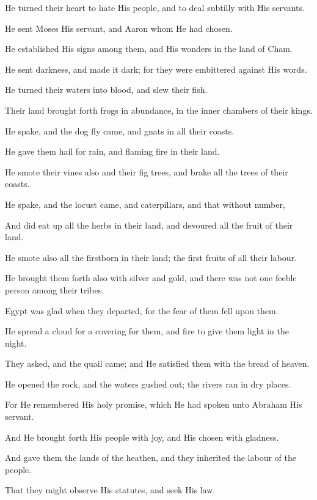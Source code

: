 He turned their heart to hate His people, and to deal subtilly with His servants.

He sent Moses His servant, and Aaron whom He had chosen.

He established His signs among them, and His wonders in the land of Cham.

He sent darkness, and made it dark; for they were embittered against His words.

He turned their waters into blood, and slew their fish.

Their land brought forth frogs in abundance, in the inner chambers of their kings.

He spake, and the dog fly came, and gnats in all their coasts.

He gave them hail for rain, and flaming fire in their land.

He smote their vines also and their fig trees, and brake all the trees of their coasts.

He spake, and the locust came, and caterpillars, and that without number,

And did eat up all the herbs in their land, and devoured all the fruit of their land.

He smote also all the firstborn in their land; the first fruits of all their labour.

He brought them forth also with silver and gold, and there was not one feeble person among their tribes.

Egypt was glad when they departed, for the fear of them fell upon them.

He spread a cloud for a covering for them, and fire to give them light in the night.

They asked, and the quail came; and He satisfied them with the bread of heaven.

He opened the rock, and the waters gushed out; the rivers ran in dry places.

For He remembered His holy promise, which He had spoken unto Abraham His servant.

And He brought forth His people with joy, and His chosen with gladness.

And gave them the lands of the heathen, and they inherited the labour of the people.

That they might observe His statutes, and seek His law.
